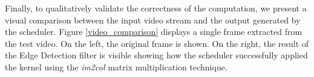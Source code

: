 Finally, to qualitatively validate the correctness of the computation, we present a visual comparison between the input video stream and the output generated by the scheduler. Figure \ref{video_comparison} displays a single frame extracted from the test video. On the left, the original frame is shown. On the right, the result of the Edge Detection filter is visible showing how the scheduler successfully applied the kernel using the \textit{im2col} matrix multiplication technique.
